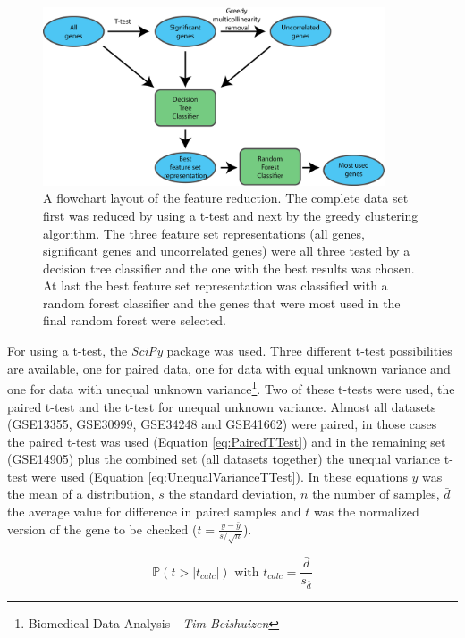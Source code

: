 \documentclass[10pt,a4paper]{report}
\begin{document}
	\begin{figure}[H]
		\includegraphics[width=0.9\textwidth]{FeatureReductionLayout.png}
		\caption{A flowchart layout of the feature reduction. The complete data set first was reduced by using a t-test and next by the greedy clustering algorithm. The three feature set representations (all genes, significant genes and uncorrelated genes) were all three tested by a decision tree classifier and the one with the best results was chosen. At last the best feature set representation was classified with a random forest classifier and the genes that were most used in the final random forest were selected.}
		\label{fig:FeatureReductionLayout}
	\end{figure}
	
	
	For using a t-test, the \textit{SciPy} package was used. Three different t-test possibilities are available, one for paired data, one for data with equal unknown variance and one for data with unequal unknown variance\footnote{\label{fn:BDA}Biomedical Data Analysis - \textit{Tim Beishuizen}}. Two of these t-tests were used, the paired t-test and the t-test for unequal unknown variance. Almost all datasets (GSE13355, GSE30999, GSE34248 and GSE41662) were paired, in those cases the paired t-test was used (Equation \ref{eq:PairedTTest}) and in the remaining set (GSE14905) plus the combined set (all datasets together) the unequal variance t-test were used (Equation \ref{eq:UnequalVarianceTTest}). In these equations $\bar{y}$ was the mean of a distribution, $s$ the standard deviation, $n$ the number of samples, $\bar{d}$ the average value for difference in paired samples and $t$ was the normalized version of the gene to be checked ($t = \frac{y - \bar{y}}{s/\sqrt{n}}$).  
	
	\begin{equation}
	\label{eq:PairedTTest}
	\mathbb{P}(t > |t_{calc}|) \text{ with } t_{calc} =\frac{\bar{d}}{s_{\bar{d}}}
	\end{equation}
	
\end{document}
